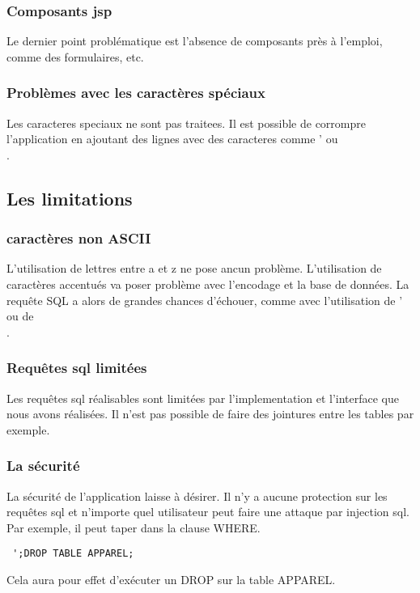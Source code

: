 \subsubsection{Composants jsp}
Le dernier point problématique est l'absence de composants près à l'emploi, comme des formulaires, etc.
\subsubsection{Problèmes avec les caractères spéciaux}
Les caracteres speciaux ne sont pas traitees. Il est possible de corrompre l'application en ajoutant des lignes avec des caracteres comme ' ou \\.
\subsection{Les limitations}
\subsubsection{caractères non ASCII}
L'utilisation de lettres entre a et z ne pose ancun problème. L'utilisation de caractères accentués va poser problème avec l'encodage et la base de données. La requête SQL a alors de grandes chances d'échouer, comme avec l'utilisation de ' ou de \\.

\subsubsection{Requêtes sql limitées}
Les requêtes sql réalisables sont limitées par l'implementation et l'interface que nous avons réalisées. Il n'est pas possible de faire des jointures entre les tables par exemple.
\subsubsection{La sécurité}
La sécurité de l'application laisse à désirer. Il n'y a aucune protection sur les requêtes sql et n'importe quel utilisateur peut faire une attaque par injection sql. 
Par exemple, il peut taper dans la clause WHERE.
\begin{verbatim}
 ';DROP TABLE APPAREL;
\end{verbatim}
Cela aura pour effet d'exécuter un DROP sur la table APPAREL.



